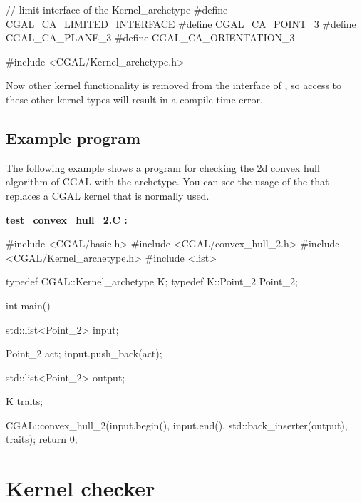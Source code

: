 \ccHtmlLinksOff

\begin{ccExampleCode}
// limit interface of the Kernel_archetype
#define CGAL_CA_LIMITED_INTERFACE
#define CGAL_CA_POINT_3
#define CGAL_CA_PLANE_3
#define CGAL_CA_ORIENTATION_3

#include <CGAL/Kernel_archetype.h>
\end{ccExampleCode}

\ccHtmlLinksOn

Now other kernel functionality is removed from the interface of
, so access to these other kernel types will result
in a compile-time error.

\subsection{Example program}

The following example shows a program for checking the 2d convex hull algorithm
of CGAL with the archetype. You can see the usage of the
 that replaces a CGAL kernel that is normally used.

\ccHtmlLinksOff

{\bf test\_convex\_hull\_2.C :}

\begin{ccExampleCode}
#include <CGAL/basic.h>
#include <CGAL/convex_hull_2.h>
#include <CGAL/Kernel_archetype.h>
#include <list>

typedef CGAL::Kernel_archetype      K;
typedef K::Point_2                  Point_2;

int main()
{
  std::list<Point_2> input;
  
  Point_2 act;
  input.push_back(act);

  std::list<Point_2> output;

  K  traits;

  CGAL::convex_hull_2(input.begin(), input.end(),
                      std::back_inserter(output), traits);		        
  return 0;
}
\end{ccExampleCode}

\ccHtmlLinksOn

\section{Kernel checker}
